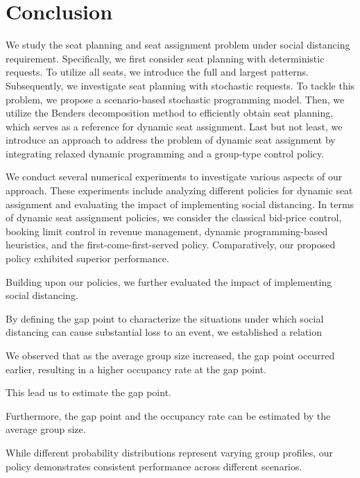 \section{Conclusion}\label{sec_conclusion}
We study the seat planning and seat assignment problem under social distancing requirement. 
Specifically, we first consider seat planning with deterministic requests. To utilize all seats, we introduce the full and largest patterns. Subsequently, we investigate seat planning with stochastic requests. To tackle this problem, we propose a scenario-based stochastic programming model.
Then, we utilize the Benders decomposition method to efficiently obtain seat planning, which serves as a reference for dynamic seat assignment. Last but not least, we introduce an approach to address the problem of dynamic seat assignment by integrating relaxed dynamic programming and a group-type control policy. 


We conduct several numerical experiments to investigate various aspects of our approach. These experiments include analyzing different policies for dynamic seat assignment and evaluating the impact of implementing social distancing. In terms of dynamic seat assignment policies, we consider the classical bid-price control, booking limit control in revenue management, dynamic programming-based heuristics, and the first-come-first-served policy. Comparatively, our proposed policy exhibited superior performance.

Building upon our policies, we further evaluated the impact of implementing social distancing. 

By defining the gap point to characterize the situations under which social distancing
can cause substantial loss to an event, we established a relation 

We observed that as the average group size increased, the gap point occurred earlier, resulting in a higher occupancy rate at the gap point. 

This lead us to estimate the gap point.

Furthermore, the gap point and the occupancy rate can be estimated by the average group size.

While different probability distributions represent varying group profiles, our policy demonstrates consistent performance across different scenarios. 



